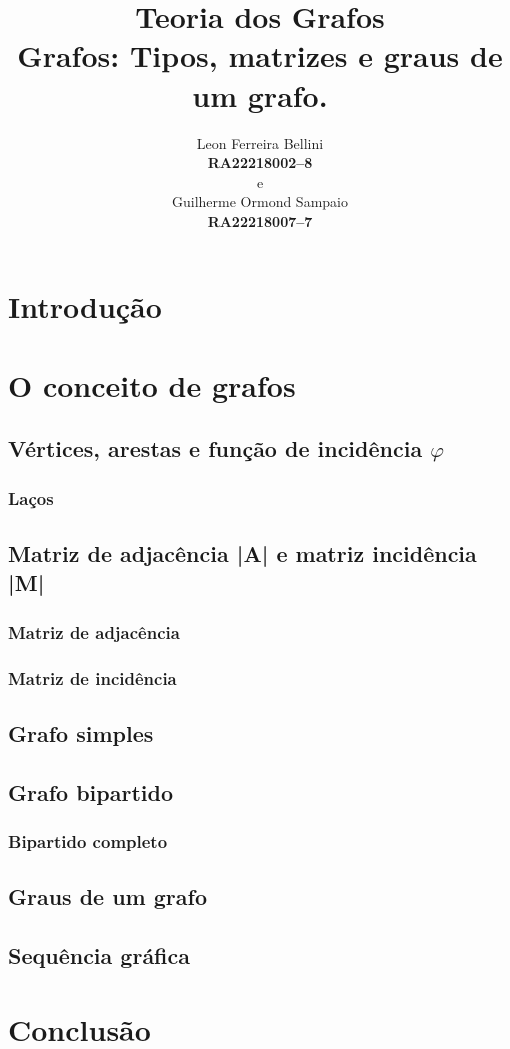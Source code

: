 \documentclass[a4paper, 12pt]{article}
\begin{document}
\title{\textbf{Teoria dos Grafos}\\ \small{Grafos: Tipos, matrizes e graus de um grafo.}}
\author{Leon Ferreira Bellini\\
	\small{\textbf{RA\@ 22218002--8}}\\
	e\\
   Guilherme Ormond Sampaio\\
   \small{\textbf{RA\@ 22218007--7}}
}
\date{}
\maketitle
\section{Introdução}
\section{O conceito de grafos}
\subsection{Vértices, arestas e função de incidência {$\varphi$}}
\subsubsection{Laços}
\subsection{Matriz de adjacência |A| e matriz incidência |M| }
\subsubsection{Matriz de adjacência}
\subsubsection{Matriz de incidência}
\subsection{Grafo simples}
\subsection{Grafo bipartido}
\subsubsection{Bipartido completo}
\subsection{Graus de um grafo}
\subsection{Sequência gráfica}
\section{Conclusão}
\end{document}
